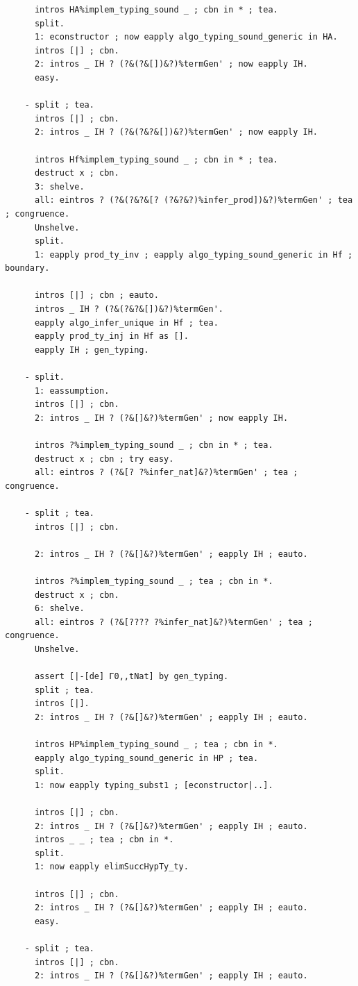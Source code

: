\documentclass[10pt,a4paper]{amsart}
\begin{document}
\begin{lstlisting}
      intros HA%implem_typing_sound _ ; cbn in * ; tea.
      split.
      1: econstructor ; now eapply algo_typing_sound_generic in HA.
      intros [|] ; cbn.
      2: intros _ IH ? (?&(?&[])&?)%termGen' ; now eapply IH.
      easy.

    - split ; tea.
      intros [|] ; cbn.
      2: intros _ IH ? (?&(?&?&[])&?)%termGen' ; now eapply IH.

      intros Hf%implem_typing_sound _ ; cbn in * ; tea.
      destruct x ; cbn.
      3: shelve.
      all: eintros ? (?&(?&?&[? (?&?&?)%infer_prod])&?)%termGen' ; tea ; congruence.
      Unshelve.
      split.
      1: eapply prod_ty_inv ; eapply algo_typing_sound_generic in Hf ; boundary.

      intros [|] ; cbn ; eauto.
      intros _ IH ? (?&(?&?&[])&?)%termGen'.
      eapply algo_infer_unique in Hf ; tea.
      eapply prod_ty_inj in Hf as [].
      eapply IH ; gen_typing.

    - split.
      1: eassumption.
      intros [|] ; cbn.
      2: intros _ IH ? (?&[]&?)%termGen' ; now eapply IH.
      
      intros ?%implem_typing_sound _ ; cbn in * ; tea.
      destruct x ; cbn ; try easy.
      all: eintros ? (?&[? ?%infer_nat]&?)%termGen' ; tea ; congruence.

    - split ; tea.
      intros [|] ; cbn.

      2: intros _ IH ? (?&[]&?)%termGen' ; eapply IH ; eauto.

      intros ?%implem_typing_sound _ ; tea ; cbn in *.
      destruct x ; cbn.
      6: shelve.
      all: eintros ? (?&[???? ?%infer_nat]&?)%termGen' ; tea ; congruence.
      Unshelve.

      assert [|-[de] Γ0,,tNat] by gen_typing.
      split ; tea.
      intros [|].
      2: intros _ IH ? (?&[]&?)%termGen' ; eapply IH ; eauto.

      intros HP%implem_typing_sound _ ; tea ; cbn in *.
      eapply algo_typing_sound_generic in HP ; tea.
      split.
      1: now eapply typing_subst1 ; [econstructor|..].

      intros [|] ; cbn.
      2: intros _ IH ? (?&[]&?)%termGen' ; eapply IH ; eauto.
      intros _ _ ; tea ; cbn in *.
      split.
      1: now eapply elimSuccHypTy_ty.
      
      intros [|] ; cbn.
      2: intros _ IH ? (?&[]&?)%termGen' ; eapply IH ; eauto.
      easy.

    - split ; tea.
      intros [|] ; cbn.
      2: intros _ IH ? (?&[]&?)%termGen' ; eapply IH ; eauto.


\end{lstlisting}
\end{document}
